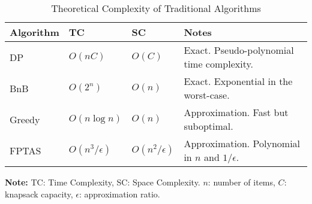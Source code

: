 \begin{table}[htbp]
    \centering
    \caption{Theoretical Complexity of Traditional Algorithms}
    \label{tab:complexity_comparison}
    \small
    \begin{tabular}{@{}l l l p{5cm}@{}}
        \toprule
        \textbf{Algorithm} & \textbf{TC} & \textbf{SC} & \textbf{Notes} \\
        \midrule
        DP & $O(nC)$ & $O(C)$ & Exact. Pseudo-polynomial time complexity. \\
        BnB & $O(2^n)$ & $O(n)$ & Exact. Exponential in the worst-case. \\
        Greedy & $O(n \log n)$ & $O(n)$ & Approximation. Fast but suboptimal. \\
        FPTAS & $O(n^3/\epsilon)$ & $O(n^2/\epsilon)$ & Approximation. Polynomial in $n$ and $1/\epsilon$. \\
        \bottomrule
    \end{tabular}

    \begin{minipage}{0.9\textwidth}
        \vspace{2pt} %
        \small %
        \textbf{Note:} TC: Time Complexity, SC: Space Complexity. $n$: number of items, $C$: knapsack capacity, $\epsilon$: approximation ratio.
    \end{minipage}
\end{table}